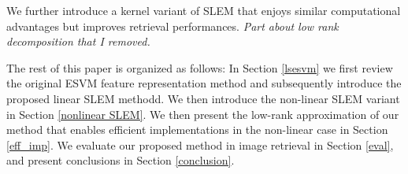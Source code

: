We further introduce a kernel variant of SLEM that enjoys similar computational advantages but improves retrieval performances. \emph{\color{red} Part about low rank decomposition that I removed.}


The rest of this paper is organized as follows:
In Section \ref{lsesvm} we first review the original ESVM feature representation method and subsequently introduce the proposed linear SLEM methodd. We then introduce the non-linear SLEM variant in Section \ref{nonlinear SLEM}. We then present the low-rank approximation of our method that enables efficient implementations in the non-linear case in  Section \ref{eff_imp}. We evaluate our proposed method in image retrieval in Section \ref{eval}, and present conclusions in Section \ref{conclusion}.








